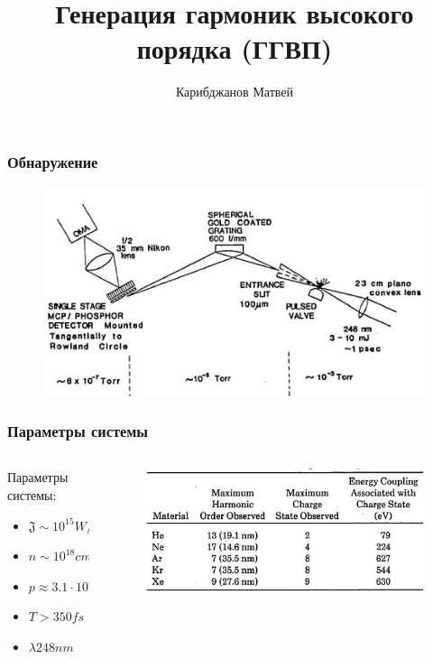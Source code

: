 \documentclass[handout]{beamer}
\title{Генерация гармоник высокого порядка (ГГВП)}
\author{Карибджанов Матвей}
\begin{document}
\begin{frame}%
    \titlepage
\end{frame}

\begin{frame}
    \frametitle{Обнаружение}
    \begin{figure}[h]
        \centering
        \includegraphics[width=1\textwidth]{Mc/ex_1.jpg}
    \end{figure}
\end{frame}


\begin{frame}
    \frametitle{Параметры системы}
    \begin{columns}
        \begin{column}{0.3\textwidth}
            Параметры системы:
            \begin{itemize}
                \item $\mathfrak{J} \sim 10^{15} W/cm^2$
                \item $n \sim 10^{18} cm^{-3}$
                \item $p \approx 3.1 \cdot 10^4 Torr$
                \item $T > 350 fs$
                \item $\lambda 248 nm$
            \end{itemize}
        \end{column}

        \begin{column}{0.7\textwidth}
            \begin{figure}[h]
                \centering
                \includegraphics[width=1\textwidth]{Mc/samp_max_n.jpg}
            \end{figure}
        \end{column}
      \end{columns}
\end{frame}
\end{document}
